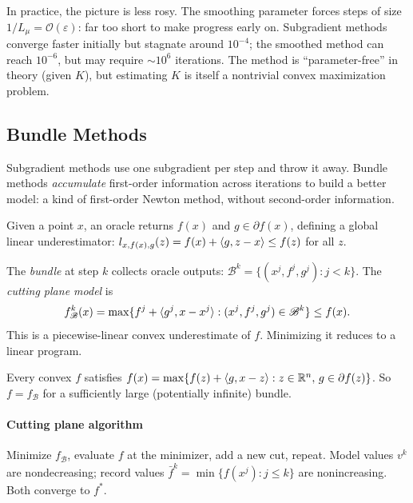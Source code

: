 In practice, the picture is less rosy.
The smoothing parameter forces steps of size $1/L_\mu = \mathcal{O}(\varepsilon)$: far too short to make progress early on.
Subgradient methods converge faster initially but stagnate around $10^{-4}$; the smoothed method can reach $10^{-6}$, but may require $\sim\!10^6$ iterations.
The method is ``parameter-free'' in theory (given $K$), but estimating $K$ is itself a nontrivial convex maximization problem.


\subsection{Bundle Methods}\label{sec:bundle-methods}

Subgradient methods use one subgradient per step and throw it away.
Bundle methods \emph{accumulate} first-order information across iterations to build a better model: a kind of first-order Newton method, without second-order information.

Given a point $x$, an oracle returns $f(x)$ and $g \in \partial f(x)$, defining a global linear underestimator:
$l_{x, f(x), g}(z) = f(x) + \langle g, z - x\rangle \leq f(z)$ for all $z$.

\begin{definition}\label{def:bundle}
	The \emph{bundle} at step $k$ collects oracle outputs: $\mathcal{B}^k = \{(x^j, f^j, g^j) : j < k\}$.
	The \emph{cutting plane model} is
	\begin{equation}\label{eq:cutting-plane}
		f_{\mathcal{B}}^k(x) = \max\{f^j + \langle g^j, x - x^j\rangle : (x^j, f^j, g^j) \in \mathcal{B}^k\} \leq f(x).
	\end{equation}
	This is a piecewise-linear convex underestimate of $f$.
	Minimizing it reduces to a linear program.
\end{definition}

\begin{theorem}\label{thm:convex-max-affine}
	Every convex $f$ satisfies $f(x) = \max\{f(z) + \langle g, x - z\rangle : z \in \mathbb{R}^n,\, g \in \partial f(z)\}$.
	So $f = f_{\mathcal{B}}$ for a sufficiently large (potentially infinite) bundle.
\end{theorem}

\paragraph{Cutting plane algorithm}

Minimize $f_{\mathcal{B}}$, evaluate $f$ at the minimizer, add a new cut, repeat.
Model values $v^k$ are nondecreasing; record values $\bar{f}^k = \min\{f(x^j) : j \leq k\}$ are nonincreasing.
Both converge to $f^*$.

